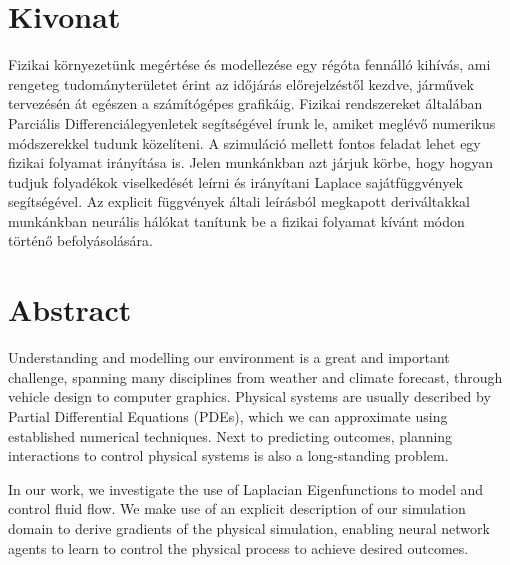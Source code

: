 \setcounter{page}{1}

\selecthungarian

\chapter*{Kivonat}

Fizikai környezetünk megértése és modellezése egy régóta fennálló kihívás, ami
rengeteg tudományterületet érint az időjárás előrejelzéstől kezdve, járművek
tervezésén át egészen a számítógépes grafikáig. Fizikai rendszereket általában
Parciális Differenciálegyenletek segítségével írunk le, amiket meglévő numerikus
módszerekkel tudunk közelíteni. A szimuláció mellett fontos feladat lehet egy
fizikai folyamat irányítása is.
Jelen munkánkban azt járjuk körbe, hogy hogyan tudjuk folyadékok viselkedését
leírni és irányítani Laplace sajátfüggvények segítségével. Az explicit
függvények általi leírásból megkapott deriváltakkal munkánkban neurális hálókat
tanítunk be a fizikai folyamat kívánt módon történő befolyásolására.

\vfill
\selectenglish

\chapter*{Abstract}

Understanding and modelling our environment is a great and important challenge,
spanning many disciplines from weather and climate forecast, through vehicle
design to computer graphics. Physical systems are usually described by Partial
Differential Equations (PDEs), which we can approximate using established
numerical techniques. Next to predicting outcomes, planning interactions to
control physical systems is also a long-standing problem.

In our work, we investigate the use of Laplacian Eigenfunctions to model and
control fluid flow. We make use of an explicit description of our simulation
domain to derive gradients of the physical simulation, enabling neural network
agents to learn to control the physical process to achieve desired outcomes.

\vfill
\cleardoublepage

\selectthesislanguage

\setcounter{romanPage}{\value{page}}
